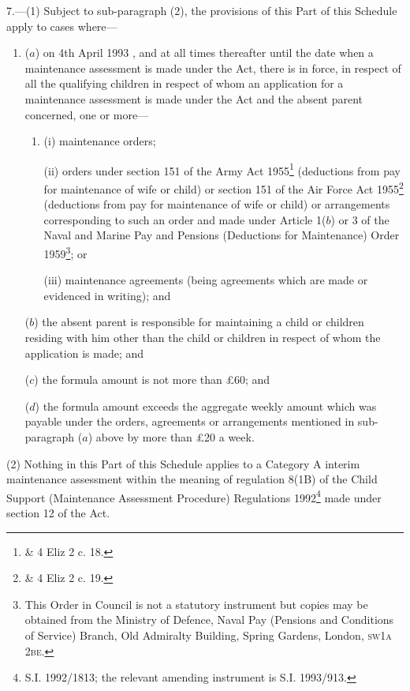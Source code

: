 \documentclass[a4paper]{article}
\begin{document}
7.—(1) Subject to sub-paragraph (2), the provisions of this Part of this Schedule apply to cases where—
\begin{enumerate}\item[]
($a$) on 4th April 1993%
, and at all times thereafter until the date when a maintenance assessment is made under the Act, %
 there is in force, in respect of all the qualifying children in respect of whom an application for a maintenance assessment is made under the Act and the absent parent concerned, one or more—
\begin{enumerate}\item[]
(i) maintenance orders;

(ii) orders under section 151 of the Army Act 1955\footnote{ \& 4 Eliz 2 c. 18.} (deductions from pay for maintenance of wife or child) or section 151 of the Air Force Act 1955\footnote{ \& 4 Eliz 2 c. 19.} (deductions from pay for maintenance of wife or child) or arrangements corresponding to such an order and made under Article 1($b$) or 3 of the Naval and Marine Pay and Pensions (Deductions for Maintenance) Order 1959\footnote{\frenchspacing This Order in Council is not a statutory instrument but copies may be obtained from the Ministry of Defence, Naval Pay (Pensions and Conditions of Service) Branch, Old Admiralty Building, Spring Gardens, London, \textsc{sw1a 2be}.}; or

(iii) maintenance agreements (being agreements which are made or evidenced in writing); and
\end{enumerate}

($b$) the absent parent is responsible for maintaining a child or children residing with him other than the child or children in respect of whom the application is made; and

($c$) the formula amount is not more than £60; and

($d$) the formula amount exceeds the aggregate weekly amount which was payable under the orders, agreements or arrangements mentioned in sub-paragraph ($a$) above by more than £20 a week.
\end{enumerate}

(2) Nothing in this Part of this Schedule applies to 
a Category A interim maintenance assessment within the meaning of regulation 8(1B) of the Child Support (Maintenance Assessment Procedure) Regulations 1992\footnote{\frenchspacing S.I. 1992/1813; the relevant amending instrument is S.I. 1993/913.} %
made under section 12 of the Act.
\end{document}
